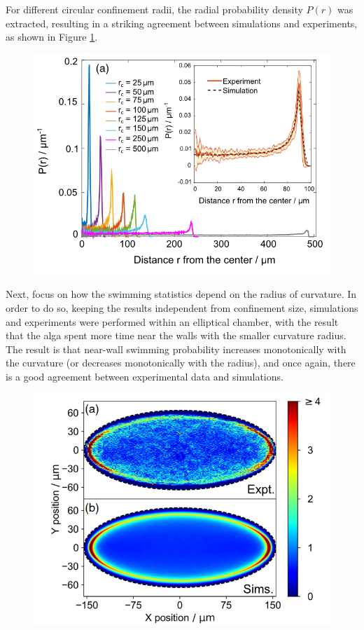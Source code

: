 \documentclass[../../master_thesis_np.tex]{subfiles}
\begin{document}
	For different circular confinement radii, the radial probability density $P(r)$ was extracted, resulting in a striking agreement between simulations and experiments, as shown in Figure \ref{fig:ostapenko1}.
	\begin{figure}[htp]
		\centering
		\includegraphics[width=\singfigwidth]{ostapenko1.png}
		\caption{\cite{ostapenko_curvature-guided_2018}}
		\label{fig:ostapenko1}
	\end{figure}
	
	Next, \citeauthor{ostapenko_curvature-guided_2018} focus on how the swimming statistics depend on the radius of curvature. 
	In order to do so, keeping the results independent from confinement size, simulations and experiments were performed within an elliptical chamber, with the result that the alga spent more time near the walls with the smaller curvature radius. 
	The result is that near-wall swimming probability increases monotonically with the curvature (or decreases monotonically with the radius), and once again, there is a good agreement between experimental data and simulations.
	\begin{figure}[htp]
		\centering
		\includegraphics[width=\singfigwidth]{ostapenko2.png}
		\caption{\cite{ostapenko_curvature-guided_2018}}
		\label{fig:ostapenko2}
	\end{figure}
	
\end{document}
